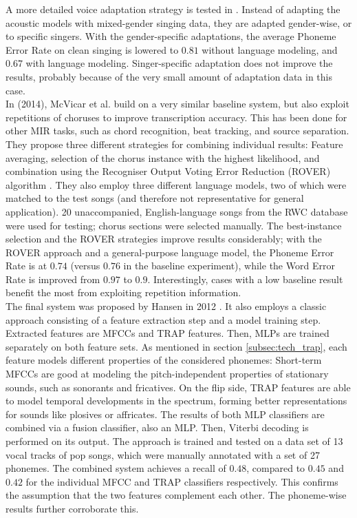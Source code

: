 A more detailed voice adaptation strategy is tested in \cite{mesaros2}. Instead of adapting the acoustic models with mixed-gender singing data, they are adapted gender-wise, or to specific singers. With the gender-specific adaptations, the average Phoneme Error Rate on clean singing is lowered to $0.81$ without language modeling, and $0.67$ with language modeling. Singer-specific adaptation does not improve the results, probably because of the very small amount of adaptation data in this case.\\

In \cite{McVicar2014} (2014), McVicar et al. build on a very similar baseline system, but also exploit repetitions of choruses to improve transcription accuracy. This has been done for other MIR tasks, such as chord recognition, beat tracking, and source separation. They propose three different strategies for combining individual results: Feature averaging, selection of the chorus instance with the highest likelihood, and combination using the Recogniser Output Voting Error Reduction (ROVER) algorithm \cite{rover}. They also employ three different language models, two of which were matched to the test songs (and therefore not representative for general application). 20 unaccompanied, English-language songs from the RWC database \cite{rwc} were used for testing; chorus sections were selected manually. The best-instance selection and the ROVER strategies improve results considerably; with the ROVER approach and a general-purpose language model, the Phoneme Error Rate is at $0.74$ (versus $0.76$ in the baseline experiment), while the Word Error Rate is improved from $0.97$ to $0.9$. Interestingly, cases with a low baseline result benefit the most from exploiting repetition information.\\

The final system was proposed by Hansen in 2012 \cite{jens}. It also employs a classic approach consisting of a feature extraction step and a model training step. Extracted features are MFCCs and TRAP features. Then, MLPs are trained separately on both feature sets. As mentioned in section \ref{subsec:tech_trap}, each feature models different properties of the considered phonemes: Short-term MFCCs are good at modeling the pitch-independent properties of stationary sounds, such as sonorants and fricatives. On the flip side, TRAP features are able to model temporal developments in the spectrum, forming better representations for sounds like plosives or affricates.
The results of both MLP classifiers are combined via a fusion classifier, also an MLP. Then, Viterbi decoding is performed on its output.
The approach is trained and tested on a data set of 13 vocal tracks of pop songs, which were manually annotated with a set of 27 phonemes. The combined system achieves a recall of $0.48$, compared to $0.45$ and $0.42$ for the individual MFCC and TRAP classifiers respectively. This confirms the assumption that the two features complement each other. The phoneme-wise results further corroborate this.\\

